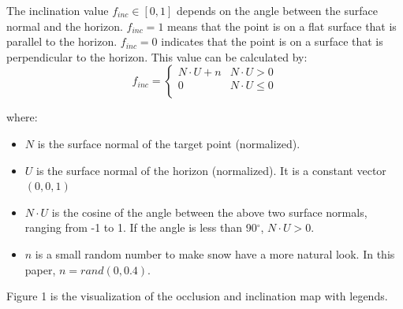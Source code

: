 \documentclass{article}
\begin{document}
The inclination value \( f_{inc} \in [0, 1] \) depends on the angle between the surface normal and the horizon. \( f_{inc}=1 \) means 
that the point is on a flat surface that is parallel to the horizon. \( f_{inc}=0 \) indicates that the point is on a surface that is 
perpendicular to the horizon. This value can be calculated by:
\[
  f_{inc}=
  \left\{
    \begin{array}{ll}
      N \cdot U + n & N \cdot U > 0 \\
      0 & N \cdot U \leq 0 \\
    \end{array} 
  \right. 
\]

where:
\begin{itemize}
  \item \( N \) is the surface normal of the target point (normalized).
  \item \( U \) is the surface normal of the horizon (normalized). It is a constant vector \((0, 0, 1)\)
  \item \( N \cdot U \) is the cosine of the angle between the above two surface normals, ranging from -1 to 1. If the angle is less 
  than 90$^{\circ}$, \( N \cdot U > 0\).
  \item \( n \) is a small random number to make snow have a more natural look. In this paper, \(n = rand(0, 0.4)\).
\end{itemize}

Figure 1 is the visualization of the occlusion and inclination map with legends. 
\end{document}
